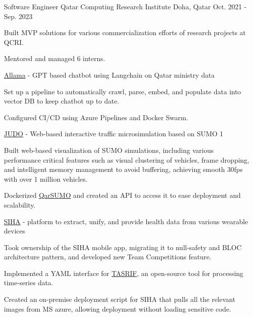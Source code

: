 \begin{cventries}
  \cventry
    {Software Engineer} %
    {Qatar Computing Research Institute} %
    {Doha, Qatar} %
    {Oct. 2021 - Sep. 2023} %
    {
      \begin{cvitems}
        \item {Built MVP solutions for various commercialization efforts of research projects at QCRI.}
        \item {Mentored and managed 6 interns.}
        \renewcommand{\labelitemi}{}
        \item {\hspace{-3.0mm}\underline{{\href{https://allama.qcri.org}{Allama}}} - GPT based chatbot using Langchain on Qatar ministry data}
        \renewcommand{\labelitemi}{\bullet}
        \item {Set up a pipeline to automatically crawl, parse, embed, and populate data into vector DB to keep chatbot up to date.}
        \item {Configured CI/CD using Azure Pipelines and Docker Swarm.}
        \renewcommand{\labelitemi}{}
        \item {\hspace{-3.0mm} \underline{{\href{https://judo.qcri.org}{JUDO}}} - Web-based interactive traffic microsimulation based on SUMO}
        \renewcommand{\labelitemi}{\bullet}1
        \item {Built web-based visualization of SUMO simulations, including various performance critical features such as visual clustering
        of vehicles, frame dropping, and intelligent memory management to avoid buffering, achieving smooth 30fps with over 1 million vehicles.}
        \item {Dockerized \underline{\href{https://github.com/qcri/qarsumo}{QarSUMO}} and created an API to access it to ease deployment and scalability.}
        \renewcommand{\labelitemi}{}
        \item {\hspace{-3.0mm}\underline{{\href{https://siha.qcri.org}{SIHA}}} - platform to extract, unify, and provide health data from various wearable devices}
        \renewcommand{\labelitemi}{\bullet}
        \item {Took ownership of the SIHA mobile app, migrating it to null-safety and BLOC architecture pattern, and developed new Team Competitions feature.}
        \item {Implemented a YAML interface for \underline{\href{https://github.com/qcri/tasrif}{TASRIF}}, an open-source tool for processing time-series data.}
        \item {Created an on-premise deployment script for SIHA that pulls all the relevant images from MS azure, allowing deployment without loading sensitive code.}
      \end{cvitems}
    }


\end{cventries}
